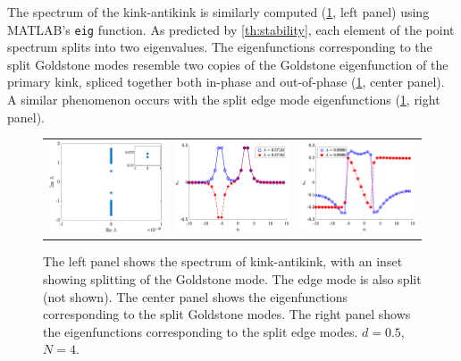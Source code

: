 \documentclass[12pt,reqno]{amsart}
\begin{document}
The spectrum of the kink-antikink is similarly computed (\cref{fig:kakspec}, left panel) using MATLAB's \texttt{eig} function. As predicted by \cref{th:stability}, each element of the point spectrum splits into two eigenvalues. The eigenfunctions corresponding to the split Goldstone modes resemble two copies of the Goldstone eigenfunction of the primary kink, spliced together both in-phase and out-of-phase (\cref{fig:kakspec}, center panel). A similar phenomenon occurs with the split edge mode eigenfunctions (\cref{fig:kakspec}, right panel).

\begin{figure}[H]
	\begin{center}
	\begin{tabular}{ccc}
	\includegraphics[width=5cm]{kak50_8spec.eps}	&
	\includegraphics[width=5cm]{kak50_8goldstone.eps} &
	\includegraphics[width=5cm]{kak50_8edge.eps}
	\end{tabular}
	\end{center}
	\caption{The left panel shows the spectrum of kink-antikink, with an
	inset showing splitting of the Goldstone mode. The edge mode is also split (not shown). The center panel shows the eigenfunctions corresponding to the split Goldstone modes. The right panel shows the eigenfunctions corresponding to the split edge modes. $d = 0.5$, $N = 4$.}
	\label{fig:kakspec}
\end{figure}
\end{document}

